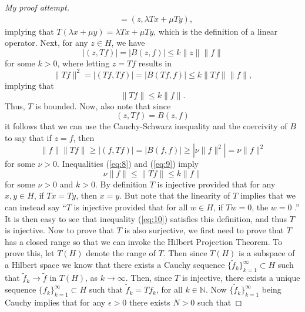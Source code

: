 \documentclass[11pt]{article}
\theoremstyle{definition}
\begin{document}
\begin{proof}[My proof attempt]
\begin{equation*}
\begin{aligned}
						 &= (z, \lambda Tx + \mu Ty),
		\end{aligned}
	\end{equation*}
	implying that $T(\lambda x + \mu y) = \lambda Tx + \mu Ty$, which is the definition of a linear operator.
	Next, for any $z \in H$, we have
	\begin{equation*}
		|(z,Tf)| = |B(z,f)| \leq k\|z\|\|f\|
	\end{equation*}
	for some $k>0$, where letting $z = Tf$ results in
	\begin{equation*}
		\|Tf\|^2 = |(Tf,Tf)| = |B(Tf,f)| \leq k\|Tf\|\|f\|,
	\end{equation*}
	implying that
	\begin{equation}
		\label{eq:8}
		\|Tf\| \leq k\|f\|.
	\end{equation}
	Thus, $T$ is bounded. Now, also note that since
	\begin{equation*}
		(z,Tf) = B(z,f)
	\end{equation*}
	it follows that we can use the Cauchy-Schwarz inequality and the coercivity of $B$ to say that if $z=f$, then
	\begin{equation}
		\label{eq:9}
		\|f\|\|Tf\| \geq |(f,Tf)| = |B(f,f)| \geq |\nu \|f\|^2| = \nu \|f\|^2
	\end{equation}
	for some $\nu > 0$. Inequalities (\ref{eq:8}) and (\ref{eq:9}) imply
	\begin{equation}
		\label{eq:10}
		\nu \|f\| \leq \|Tf\| \leq k \|f\|
	\end{equation}
	for some $\nu >0$ and $k >0$.
	By definition $T$ is injective provided that for any $x,y \in H$, if $Tx = Ty$, then $x=y$.
	But note that the linearity of $T$ implies that we can instead say ``$T$ is injective provided that
	for all $w \in H$, if $Tw = 0$, the $w = 0$ .'' It is then easy to see that inequality (\ref{eq:10})
	satisfies this definition, and thus $T$ is injective.
	Now to prove that $T$ is also surjective, we first need to prove that $T$ has a closed range so that
	we can invoke the Hilbert Projection Theorem. To prove this, let $T(H)$ denote the range of $T$.
	Then since $T(H)$ is a subspace of a Hilbert space we know that there exists a Cauchy sequence $\{\tilde{f}_k\}_{k=1}^{\infty} \subset H$
	such that $\tilde{f}_k \rightarrow \tilde{f}$ in $T(H)$, as $k\rightarrow \infty$. Then, since $T$ is injective, there exists a unique
	sequence $\{f_k\}_{k=1}^{\infty} \subset H$ such that $\tilde{f}_k = Tf_k$, for all $k \in \mathbb{N}$. Now $\{\tilde{f}_k\}_{k=1}^{\infty}$
	being Cauchy implies that for any $\epsilon > 0$ there exists $N >0$ such that

\end{proof}
\end{document}
